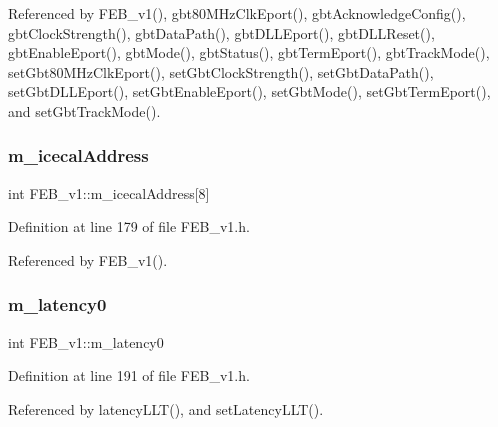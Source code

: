 Referenced by F\+E\+B\+\_\+v1(), gbt80\+M\+Hz\+Clk\+Eport(), gbt\+Acknowledge\+Config(), gbt\+Clock\+Strength(), gbt\+Data\+Path(), gbt\+D\+L\+L\+Eport(), gbt\+D\+L\+L\+Reset(), gbt\+Enable\+Eport(), gbt\+Mode(), gbt\+Status(), gbt\+Term\+Eport(), gbt\+Track\+Mode(), set\+Gbt80\+M\+Hz\+Clk\+Eport(), set\+Gbt\+Clock\+Strength(), set\+Gbt\+Data\+Path(), set\+Gbt\+D\+L\+L\+Eport(), set\+Gbt\+Enable\+Eport(), set\+Gbt\+Mode(), set\+Gbt\+Term\+Eport(), and set\+Gbt\+Track\+Mode().

\mbox{\label{classFEB__v1_adf21041831669e75283dd2a88fbaddf5}} 
\subsubsection{\texorpdfstring{m\+\_\+icecal\+Address}{m\_icecalAddress}}
{\footnotesize\ttfamily int F\+E\+B\+\_\+v1\+::m\+\_\+icecal\+Address\mbox{[}8\mbox{]}\hspace{0.3cm}{\ttfamily [private]}}



Definition at line 179 of file F\+E\+B\+\_\+v1.\+h.



Referenced by F\+E\+B\+\_\+v1().

\mbox{\label{classFEB__v1_a23a3d8bfbf96490890140f13b08a02c1}} 
\subsubsection{\texorpdfstring{m\+\_\+latency0}{m\_latency0}}
{\footnotesize\ttfamily int F\+E\+B\+\_\+v1\+::m\+\_\+latency0\hspace{0.3cm}{\ttfamily [private]}}



Definition at line 191 of file F\+E\+B\+\_\+v1.\+h.



Referenced by latency\+L\+L\+T(), and set\+Latency\+L\+L\+T().

\mbox{\label{classFEB__v1_a026d2f4973bf3ddbc404e35264fdef1f}} 
